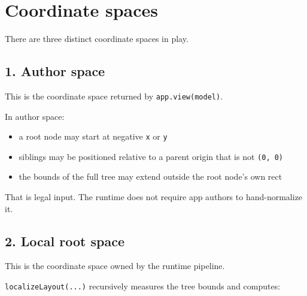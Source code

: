 \section{Coordinate spaces}\label{record-049-coordinate-spaces}

There are three distinct coordinate spaces in play.

\subsection{1. Author space}\label{record-049-author-space}

This is the coordinate space returned by \texttt{a\allowbreak{}p\allowbreak{}p\allowbreak{}.\allowbreak{}v\allowbreak{}i\allowbreak{}e\allowbreak{}w\allowbreak{}(\allowbreak{}m\allowbreak{}o\allowbreak{}d\allowbreak{}e\allowbreak{}l\allowbreak{})}.

In author space:

\begin{itemize}
\tightlist
\item
  a root node may start at negative \texttt{x} or \texttt{y}
\item
  siblings may be positioned relative to a parent origin that is not \texttt{(\allowbreak{}0\allowbreak{},\allowbreak{} \allowbreak{}0\allowbreak{})}
\item
  the bounds of the full tree may extend outside the root node's own rect
\end{itemize}

That is legal input. The runtime does not require app authors to hand-normalize it.

\subsection{2. Local root space}\label{record-049-local-root-space}

This is the coordinate space owned by the runtime pipeline.

\texttt{l\allowbreak{}o\allowbreak{}c\allowbreak{}a\allowbreak{}l\allowbreak{}i\allowbreak{}z\allowbreak{}e\allowbreak{}L\allowbreak{}a\allowbreak{}y\allowbreak{}o\allowbreak{}u\allowbreak{}t\allowbreak{}(\allowbreak{}.\allowbreak{}.\allowbreak{}.\allowbreak{})} recursively measures the tree bounds and computes:

